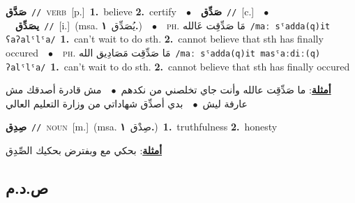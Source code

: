 \documentclass[10pt,a4paper,twoside]{article} %
\begin{document}
\begin{multicols}{2}
{\setlength\topsep{0pt}\textbf{\foreignlanguage{arabic}{صَدَّق}}\ {\color{gray}\texttt{//}\color{black}}\ \textsc{verb}\ [p.]\ \textbf{1.}~believe  \textbf{2.}~certify\ \ $\bullet$\ \ \setlength\topsep{0pt}\textbf{\foreignlanguage{arabic}{صَدِّق}}\ {\color{gray}\texttt{//}\color{black}}\ [c.]\ \ $\bullet$\ \ \setlength\topsep{0pt}\textbf{\foreignlanguage{arabic}{يصَدِّق}}\ {\color{gray}\texttt{//}\color{black}}\ [i.]\ \color{gray}(msa. \foreignlanguage{arabic}{يُصَدِّق}~\foreignlanguage{arabic}{\textbf{١.}})\color{black}\ \ $\bullet$\ \ \textsc{ph.} \color{gray} \foreignlanguage{arabic}{مَا صَدِّقِت عَالله}\color{black}\ {\color{gray}\texttt{/{\sffamily maː sˤadda(q)it ʕaʔalˤlˤa}/}\color{black}}\ \textbf{1.}~can't wait to do sth.  \textbf{2.}~cannot believe that sth has finally occured\ \ $\bullet$\ \ \textsc{ph.} \color{gray} \foreignlanguage{arabic}{مَا صَدِّقِت مَصَادِيق الله}\color{black}\ {\color{gray}\texttt{/{\sffamily maː sˤadda(q)it masˤaːdiː(q) ʔalˤlˤa}/}\color{black}}\ \textbf{1.}~can't wait to do sth.  \textbf{2.}~cannot believe that sth has finally occured\  \begin{flushright}\color{gray}\foreignlanguage{arabic}{\textbf{\underline{\foreignlanguage{arabic}{أمثلة}}}: ما صَدِّقِت عالله وأنت جاي تخلصني من نكدهم\ $\bullet$\ \  مش قادرة أصدقك مش عارفة ليش\ $\bullet$\ \  بدي أصدِّق شهاداتي من وزارة التعليم العالي}\end{flushright}\color{black}} \vspace{2mm}

{\setlength\topsep{0pt}\textbf{\foreignlanguage{arabic}{صِدِق}}\ {\color{gray}\texttt{//}\color{black}}\ \textsc{noun}\ [m.]\ \color{gray}(msa. \foreignlanguage{arabic}{صِدْق}~\foreignlanguage{arabic}{\textbf{١.}})\color{black}\ \textbf{1.}~truthfulness  \textbf{2.}~honesty\  \begin{flushright}\color{gray}\foreignlanguage{arabic}{\textbf{\underline{\foreignlanguage{arabic}{أمثلة}}}: بحكي مع وبفترض بحكيك الصِّدِق}\end{flushright}\color{black}} \vspace{2mm}

\vspace{-3mm}
\subsection*{\color{blue}\foreignlanguage{arabic}{ص.د.م}\color{blue}{}} 


\end{multicols}
\end{document}
